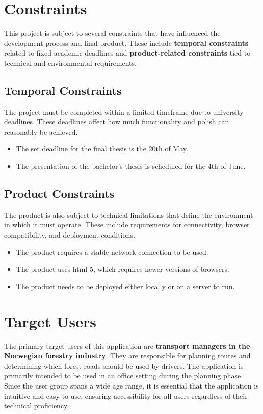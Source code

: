 \section{Constraints}

This project is subject to several constraints that have influenced the development process and final product. These include \textbf{temporal constraints} related to fixed academic deadlines and \textbf{product-related constraints} tied to technical and environmental requirements.

\subsection{Temporal Constraints}

The project must be completed within a limited timeframe due to university deadlines. These deadlines affect how much functionality and polish can reasonably be achieved.

\begin{itemize}
    \item The set deadline for the final thesis is the 20th of May.
    \item The presentation of the bachelor's thesis is scheduled for the 4th of June.
\end{itemize}

\subsection{Product Constraints}

The product is also subject to technical limitations that define the environment in which it must operate. These include requirements for connectivity, browser compatibility, and deployment conditions.

\begin{itemize}
    \item The product requires a stable network connection to be used.
    \item The product uses \acrshort{html} 5, which requires newer versions of browsers.
    \item The product needs to be deployed either locally or on a server to run.
\end{itemize}

\section{Target Users}

The primary target users of this application are \textbf{transport managers in the Norwegian forestry industry}. They are responsible for planning routes and determining which forest roads should be used by drivers. The application is primarily intended to be used in an office setting during the planning phase. Since the user group spans a wide age range, it is essential that the application is intuitive and easy to use, ensuring accessibility for all users regardless of their technical proficiency.


